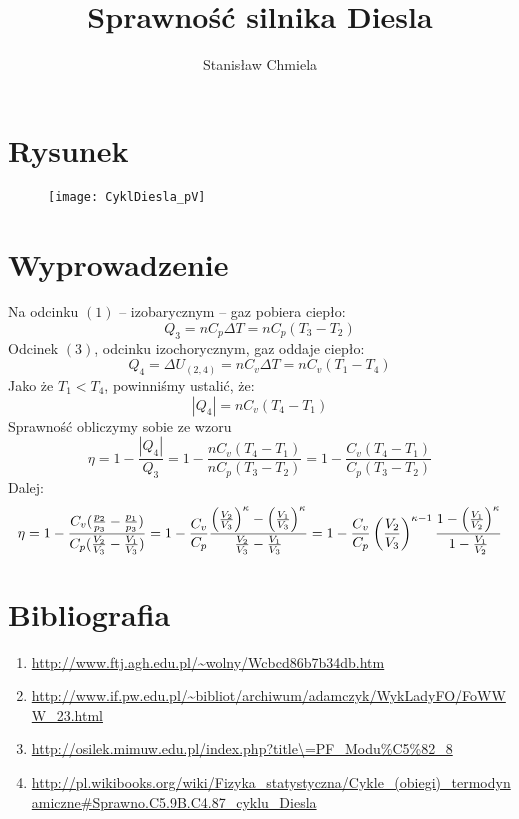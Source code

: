 \documentclass [a4paper, 12pt]{article}
\author{Stanisław Chmiela}
\title{Sprawność silnika Diesla}
\begin{document}
\maketitle
\section{Rysunek}
\begin{figure}[h]
\centering
\texttt{[image: CyklDiesla\_pV]}
\end{figure}
\section{Wyprowadzenie}
Na odcinku $(1)$ -- izobarycznym -- gaz pobiera ciepło:
\[
    Q_3 = nC_p \Delta T = nC_p (T_3-T_2)
\]
Odcinek $(3)$, odcinku izochorycznym, gaz oddaje ciepło:
\[
    Q_4 = \Delta U_{(2,4)} = nC_v \Delta T = nC_v(T_1-T_4)
\]
Jako że $T_1 < T_4$, powinniśmy ustalić, że:
\[
    |Q_4| = nC_v(T_4-T_1)
\]
Sprawność obliczymy sobie ze wzoru
\[
    \eta = 1-\frac{|Q_4|}{Q_3} = 1-\frac{nC_v(T_4-T_1)}{nC_p(T_3-T_2)} = 1-\frac{C_v(T_4-T_1)}{C_p(T_3-T_2)}
\]
Dalej:
\[
    \eta = 1-\frac{C_v(\frac{p_2}{p_3} - \frac{p_1}{p_3})}{C_p(\frac{V_2}{V_3} - \frac{V_1}{V_3})} =1-{\frac{C_v}{C_p}}{{\left({\frac{V_2}{V_3}}\right)^{\kappa}-\left({\frac{V_1}{V_3}}\right)^{\kappa}}\over{{{V_2}\over{V_3}}-{{V_1}\over{V_3}}}}=1-{\frac{C_v}{C_p}}\left({\frac{V_2}{V_3}}\right)^{\kappa-1}{{1-\left({{V_1}\over{V_2}}\right)^{\kappa}}\over{1-{\frac{V_1}{V_2}}}}
\]
\section{Bibliografia}
\begin{enumerate}
    \item \url{http://www.ftj.agh.edu.pl/\~wolny/Wcbcd86b7b34db.htm}
    \item \url{http://www.if.pw.edu.pl/\~bibliot/archiwum/adamczyk/WykLadyFO/FoWWW\_23.html}
    \item \url{http://osilek.mimuw.edu.pl/index.php?title\=PF\_Modu\%C5\%82\_8}
    \item \url{http://pl.wikibooks.org/wiki/Fizyka\_statystyczna/Cykle\_(obiegi)\_termodynamiczne\#Sprawno.C5.9B.C4.87\_cyklu\_Diesla}
\end{enumerate}
\end{document}

